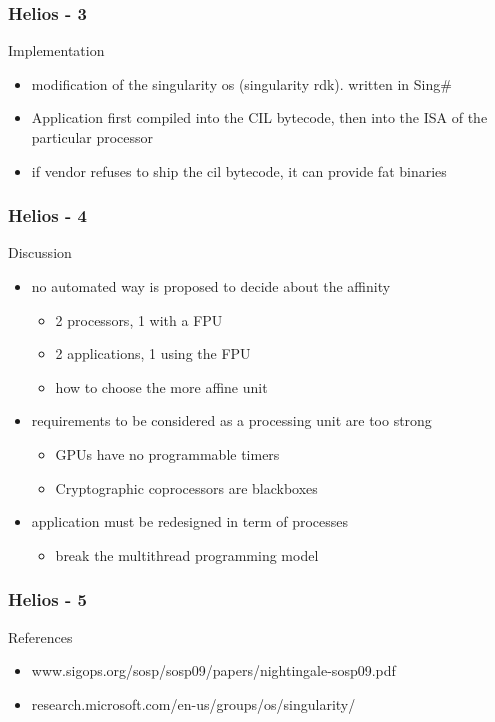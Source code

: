 \begin{frame}
\frametitle{Helios - 3}
Implementation
  \begin{itemize}
    \item modification of the singularity os (singularity rdk). written in Sing\#
    \item Application first compiled into the CIL bytecode, then into the ISA of the particular processor
    \item if vendor refuses to ship the cil bytecode, it can provide fat binaries
  \end{itemize}
\end{frame}


\begin{frame}
\frametitle{Helios - 4}
Discussion
  \begin{itemize}
    \item no automated way is proposed to decide about the affinity
    \begin{itemize}
      \item 2 processors, 1 with a FPU
      \item 2 applications, 1 using the FPU
      \item how to choose the more affine unit
    \end{itemize}
    \item requirements to be considered as a processing unit are too strong
    \begin{itemize}
      \item GPUs have no programmable timers
      \item Cryptographic coprocessors are blackboxes
    \end{itemize}
    \item application must be redesigned in term of processes
    \begin{itemize} \item break the multithread programming model \end{itemize}
  \end{itemize}
\end{frame}


\begin{frame}
\frametitle{Helios - 5}
References
  \begin{itemize}
    \item www.sigops.org/sosp/sosp09/papers/nightingale-sosp09.pdf
    \item research.microsoft.com/en-us/groups/os/singularity/
  \end{itemize}
\end{frame}


